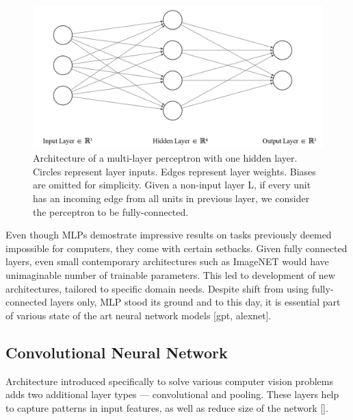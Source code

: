 \begin{figure}[!h]
    \begin{center}
    \begin{minipage}{.75\textwidth}
      \includegraphics[width=\textwidth]{img/nn.png}
    \end{minipage}
    \caption{Architecture of a multi-layer perceptron with one hidden layer. Circles represent layer inputs. Edges represent layer weights. Biases are omitted for simplicity. Given a non-input layer L, if every unit has an incoming edge from all units in previous layer, we consider the perceptron to be fully-connected.}
    \label{fig:simple-mlp}
    \end{center}
\end{figure}

Even though MLPs demostrate impressive results on tasks previously deemed impossible for computers, they come with certain setbacks. Given fully connected layers, even small contemporary architectures such as ImageNET would have unimaginable number of trainable parameters. This led to development of new architectures, tailored to specific domain needs. Despite shift from using fully-connected layers only, MLP stood its ground and to this day, it is essential part of various state of the art neural network models [gpt, alexnet].

\subsection*{Convolutional Neural Network}
Architecture introduced specifically to solve various computer vision problems adds two additional layer types --- convolutional and pooling. These layers help to capture patterns in input features, as well as reduce size of the network []. 


